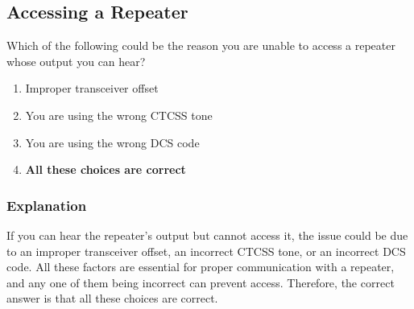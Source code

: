 \subsection{Accessing a Repeater}
\label{T2B04}

\begin{tcolorbox}[colback=gray!10!white,colframe=black!75!black,title=T2B04]
Which of the following could be the reason you are unable to access a repeater whose output you can hear?
\begin{enumerate}[noitemsep]
    \item Improper transceiver offset
    \item You are using the wrong CTCSS tone
    \item You are using the wrong DCS code
    \item \textbf{All these choices are correct}
\end{enumerate}
\end{tcolorbox}

\subsubsection*{Explanation}
If you can hear the repeater's output but cannot access it, the issue could be due to an improper transceiver offset, an incorrect CTCSS tone, or an incorrect DCS code. All these factors are essential for proper communication with a repeater, and any one of them being incorrect can prevent access. Therefore, the correct answer is that all these choices are correct.